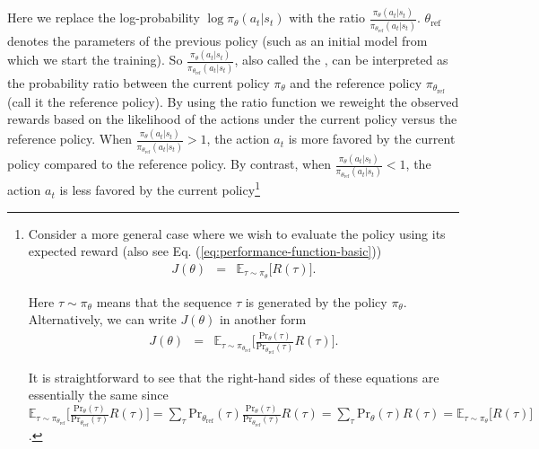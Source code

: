 \noindent Here we replace the log-probability $\log \pi_{\theta}(a_t|s_t)$ with the ratio $\frac{\pi_{\theta}(a_t|s_t)}{\pi_{\theta_{\mathrm{ref}}}(a_t|s_t)}$. $\theta_{\mathrm{ref}}$ denotes the parameters of the previous policy (such as an initial model from which we start the training). So $\frac{\pi_{\theta}(a_t|s_t)}{\pi_{\theta_{\mathrm{ref}}}(a_t|s_t)}$, also called the , can be interpreted as the probability ratio between the current policy $\pi_{\theta}$ and the reference policy $\pi_{\theta_{\mathrm{ref}}}$ (call it the reference policy). By using the ratio function we reweight the observed rewards based on the likelihood of the actions under the current policy versus the reference policy. When $\frac{\pi_{\theta}(a_t|s_t)}{\pi_{\theta_{\mathrm{ref}}}(a_t|s_t)} > 1$, the action $a_t$ is more favored by the current policy compared to the reference policy. By contrast, when $\frac{\pi_{\theta}(a_t|s_t)}{\pi_{\theta_{\mathrm{ref}}}(a_t|s_t)} < 1$, the action $a_t$ is less favored by the current policy\footnote{
Consider a more general case where we wish to evaluate the policy using its expected reward (also see Eq. (\ref{eq:performance-function-basic}))
\begin{eqnarray}
J(\theta) & = & \mathbb{E}_{\tau \sim \pi_{\theta}} \Big[ R(\tau) \Big].
\end{eqnarray}

\noindent Here $\tau \sim \pi_{\theta}$ means that the sequence $\tau$ is generated by the policy $\pi_{\theta}$. Alternatively, we can write $J(\theta)$ in another form
\begin{eqnarray}
J(\theta) & = & \mathbb{E}_{\tau \sim \pi_{\theta_{\mathrm{ref}}}} \Big[ \frac{\mathrm{Pr}_{\theta}(\tau)}{\mathrm{Pr}_{\theta_{\mathrm{ref}}}(\tau)} R(\tau) \Big]. \label{eq:importance-sampling-sequence-reward}
\end{eqnarray}

It is straightforward to see that the right-hand sides of these equations are essentially the same since $\mathbb{E}_{\tau \sim \pi_{\theta_{\mathrm{ref}}}} \Big[ \frac{\mathrm{Pr}_{\theta}(\tau)}{\mathrm{Pr}_{\theta_{\mathrm{ref}}}(\tau)} R(\tau) \Big] = \sum_{\tau} \mathrm{Pr}_{\theta_{\mathrm{ref}}}(\tau) \frac{\mathrm{Pr}_{\theta}(\tau)}{\mathrm{Pr}_{\theta_{\mathrm{ref}}}(\tau)} R(\tau) = \sum_{\tau} \mathrm{Pr}_{\theta}(\tau) R(\tau) = \mathbb{E}_{\tau \sim \pi_{\theta}} \Big[ R(\tau) \Big]$.

}
